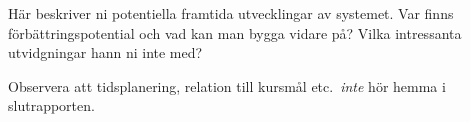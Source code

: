 Här beskriver ni potentiella framtida utvecklingar av systemet. Var finns förbättrings\-poten\-tial och vad kan man bygga vidare på? Vilka intressanta utvidgningar hann ni inte med?

Observera att tids\-planering, relation till kursmål etc.~\emph{inte} hör hemma i slutrapporten.


